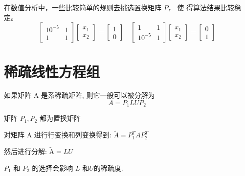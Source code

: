 在数值分析中，一些比较简单的规则去挑选置换矩阵 $ P  $， 使 得算法结果比较稳定。
$$
    \left[\begin{array}{cc}
            10^{-5} & 1 \\
            1       & 1
        \end{array}\right]\left[\begin{array}{l}
            x_{1} \\
            x_{2}
        \end{array}\right]=\left[\begin{array}{l}
            1 \\
            0
        \end{array}\right] \quad\left[\begin{array}{cc}
            1       & 1 \\
            10^{-5} & 1
        \end{array}\right]\left[\begin{array}{l}
            x_{1} \\
            x_{2}
        \end{array}\right]=\left[\begin{array}{l}
            0 \\
            1
        \end{array}\right]
$$





\section{稀疏线性方程组}

\begin{theorem}
    如果矩阵 $ \mathrm{A} $ 是系稀疏矩阵, 则它一般可以被分解为
    $$
        A=P_{1} L U P_{2}
    $$

    矩阵 $ P_{1}, P_{2} $ 都为置换矩阵
\end{theorem}

\begin{corollary}
    对矩阵 $ \mathrm{A} $ 进行行变换和列变换得到: $ \tilde{A}=P_{1}^{T} A P_{2}^{T} $

    然后进行分解: $ \widetilde{\mathrm{A}}=L U $
\end{corollary}



$ P_{1} $ 和 $ P_{2} $ 的选择会影响 $ {L} $ 和$U$的稀疏度.

